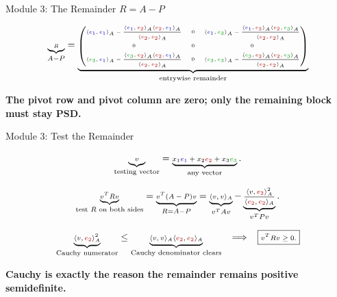 \documentclass[10pt]{beamer}
\theoremstyle{definition}
\newcommand{\x}[1]{\alert{\textbf{#1}}}
\newcommand{\rd}[1]{{\color{red!70!black}#1}}
\newcommand{\bl}[1]{{\color{blue!70!black}#1}}
\newcommand{\gn}[1]{{\color{green!60!black}#1}}
\begin{document}
\begin{frame}[shrink=8]{Module 3: The Remainder $R=A-P$}

\[
\tiny
\underbrace{R}_{A-P}
=
\underbrace{
\begin{pmatrix}
\langle \bl{e_1},\bl{e_1}\rangle_A-\dfrac{\langle \bl{e_1},\rd{e_2}\rangle_A\langle \rd{e_2},\bl{e_1}\rangle_A}{\langle \rd{e_2},\rd{e_2}\rangle_A}
&0&
\langle \bl{e_1},\gn{e_3}\rangle_A-\dfrac{\langle \bl{e_1},\rd{e_2}\rangle_A\langle \rd{e_2},\gn{e_3}\rangle_A}{\langle \rd{e_2},\rd{e_2}\rangle_A}
\\[1.25em]
0&0&0
\\[0.6em]
\langle \gn{e_3},\bl{e_1}\rangle_A-\dfrac{\langle \gn{e_3},\rd{e_2}\rangle_A\langle \rd{e_2},\bl{e_1}\rangle_A}{\langle \rd{e_2},\rd{e_2}\rangle_A}
&0&
\langle \gn{e_3},\gn{e_3}\rangle_A-\dfrac{\langle \gn{e_3},\rd{e_2}\rangle_A\langle \rd{e_2},\gn{e_3}\rangle_A}{\langle \rd{e_2},\rd{e_2}\rangle_A}
\end{pmatrix}}_{\text{entrywise remainder}}
\]

\vfill

\begin{center}
\x{The pivot row and pivot column are zero; only the remaining block must stay PSD.}
\end{center}

\end{frame}


\begin{frame}[shrink=8]{Module 3: Test the Remainder}

\[
\scriptsize
\underbrace{v}_{\text{testing vector}}
=
\underbrace{x_1\bl{e_1}+x_2\rd{e_2}+x_3\gn{e_3}}_{\text{any vector}}.
\]

\vfill

\[
\scriptsize
\underbrace{v^TRv}_{\text{test }R\text{ on both sides}}
=
\underbrace{v^T(A-P)v}_{R=A-P}
=
\underbrace{\langle v,v\rangle_A}_{v^TAv}
-
\underbrace{\frac{\langle v,\rd{e_2}\rangle_A^2}{\langle \rd{e_2},\rd{e_2}\rangle_A}}_{v^TPv}.
\]

\vfill

\[
\scriptsize
\underbrace{\langle v,\rd{e_2}\rangle_A^2}_{\text{Cauchy numerator}}
\le
\underbrace{\langle v,v\rangle_A\langle \rd{e_2},\rd{e_2}\rangle_A}_{\text{Cauchy denominator clears}}
\quad\Longrightarrow\quad
\boxed{v^TRv\ge0.}
\]

\vfill

\begin{center}
\x{Cauchy is exactly the reason the remainder remains positive semidefinite.}
\end{center}

\end{frame}
\end{document}
